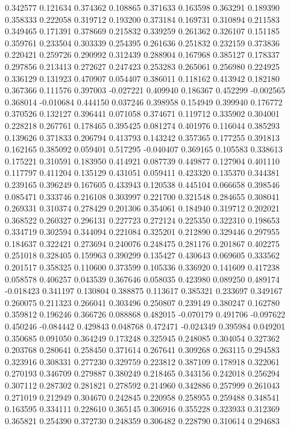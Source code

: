 0.342577
0.121634
0.374362
0.108865
0.371633
0.163598
0.363291
0.189390
0.358333
0.222058
0.319712
0.193200
0.373184
0.169731
0.310894
0.211583
0.349465
0.171391
0.378669
0.215832
0.339259
0.261362
0.326107
0.151185
0.359761
0.233504
0.303339
0.254395
0.261636
0.251832
0.232159
0.373836
0.220421
0.259726
0.290992
0.312439
0.288904
0.167968
0.385127
0.178337
0.297856
0.213413
0.272627
0.247423
0.253283
0.265061
0.256980
0.224925
0.336129
0.131923
0.470907
0.054407
0.386011
0.118162
0.413942
0.182180
0.367366
0.111576
0.397003
-0.027221
0.409940
0.186367
0.452299
-0.002565
0.368014
-0.010684
0.444150
0.037246
0.398958
0.154949
0.399940
0.176772
0.370526
0.132127
0.396441
0.071058
0.374671
0.119712
0.335902
0.304001
0.228218
0.267761
0.178465
0.395425
0.081274
0.401976
0.116044
0.385293
0.139626
0.371833
0.206794
0.413793
0.143242
0.357365
0.177255
0.391813
0.162165
0.385092
0.059401
0.517295
-0.040407
0.369165
0.105583
0.338613
0.175221
0.310591
0.183950
0.414921
0.087739
0.449877
0.127904
0.401110
0.117797
0.411204
0.135129
0.431051
0.059411
0.423320
0.135370
0.344381
0.239165
0.396249
0.167605
0.433943
0.120538
0.445104
0.066658
0.398546
0.085471
0.333746
0.216108
0.303997
0.221700
0.321548
0.284655
0.308041
0.269331
0.310374
0.278429
0.201306
0.354061
0.184940
0.319712
0.202021
0.368522
0.260327
0.296131
0.227723
0.272124
0.225350
0.322310
0.198653
0.334719
0.302594
0.344094
0.221084
0.325201
0.212890
0.329446
0.297955
0.184637
0.322421
0.273694
0.240076
0.248475
0.281176
0.201867
0.402275
0.251018
0.328405
0.159963
0.390299
0.135427
0.430643
0.069605
0.333562
0.201517
0.358325
0.110600
0.373599
0.105336
0.336920
0.141609
0.417238
0.058578
0.406257
0.043539
0.367646
0.058035
0.423980
0.089250
0.489174
-0.018423
0.341197
0.130804
0.388875
0.113617
0.385321
0.233697
0.349167
0.260075
0.211323
0.266041
0.303496
0.250807
0.239149
0.380247
0.162780
0.359812
0.196246
0.366726
0.088868
0.482015
-0.070179
0.491706
-0.097622
0.450246
-0.084442
0.429843
0.048768
0.472471
-0.024349
0.395984
0.049201
0.350685
0.091050
0.364249
0.173248
0.325945
0.248085
0.304054
0.327362
0.203768
0.280641
0.258450
0.371614
0.267641
0.309268
0.263115
0.294583
0.323916
0.308331
0.277230
0.329759
0.223812
0.387109
0.178918
0.322061
0.270193
0.346709
0.279887
0.380249
0.218465
0.343156
0.242018
0.256294
0.307112
0.287302
0.281821
0.278592
0.214960
0.342886
0.257999
0.261043
0.271019
0.212949
0.304670
0.242845
0.220958
0.258955
0.259488
0.348541
0.163595
0.334111
0.228610
0.365145
0.306916
0.355228
0.323933
0.312369
0.365821
0.254390
0.372730
0.248359
0.306482
0.228790
0.310614
0.294683
